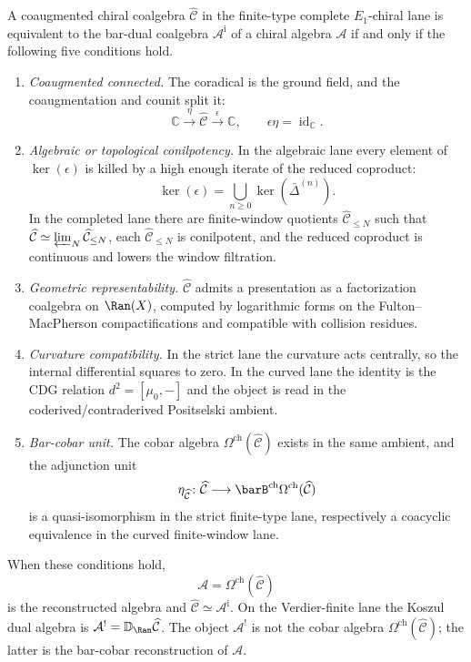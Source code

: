 \begin{theorem}\label{thm:essential-image-koszul}
A coaugmented chiral coalgebra $\widehat{\mathcal{C}}$ in the
finite-type complete $E_1$-chiral lane is equivalent to the bar-dual
coalgebra $\mathcal{A}^{\mathrm i}$ of a chiral algebra
$\mathcal{A}$ if and only if the following five conditions hold.

\begin{enumerate}
\item \emph{Coaugmented connected.} The coradical is the ground field,
and the coaugmentation and counit split it:
 \[\mathbb{C}\xrightarrow{\eta}\widehat{\mathcal{C}}
 \xrightarrow{\epsilon}\mathbb{C},
 \qquad \epsilon\eta=\operatorname{id}_{\mathbb{C}}.\]

\item \emph{Algebraic or topological conilpotency.} In the algebraic
lane every element of $\ker(\epsilon)$ is killed by a high enough
iterate of the reduced coproduct:
\[
\ker(\epsilon)=\bigcup_{n\geq 0}\ker(\bar{\Delta}^{(n)}).
\]
In the completed lane there are finite-window quotients
$\widehat{\mathcal{C}}_{\leq N}$ such that
$\widehat{\mathcal{C}}\simeq\varprojlim_N
\widehat{\mathcal{C}}_{\leq N}$, each
$\widehat{\mathcal{C}}_{\leq N}$ is conilpotent, and the reduced
coproduct is continuous and lowers the window filtration.

\item \emph{Geometric representability.} $\widehat{\mathcal{C}}$
admits a presentation as a factorization coalgebra on $\Ran(X)$,
computed by logarithmic forms on the Fulton--MacPherson
compactifications and compatible with collision residues.

\item \emph{Curvature compatibility.} In the strict lane the curvature
acts centrally, so the internal differential squares to zero. In the
curved lane the identity is the CDG relation $d^2=[\mu_0,-]$ and the
object is read in the coderived/contraderived Positselski ambient.

\item \emph{Bar-cobar unit.} The cobar algebra
$\Omega^{\mathrm{ch}}(\widehat{\mathcal{C}})$ exists in the same
ambient, and the adjunction unit
\[
\eta_{\widehat{\mathcal{C}}}\colon
\widehat{\mathcal{C}}\longrightarrow
\barB^{\mathrm{ch}}\Omega^{\mathrm{ch}}(\widehat{\mathcal{C}})
\]
is a quasi-isomorphism in the strict finite-type lane, respectively a
coacyclic equivalence in the curved finite-window lane.
\end{enumerate}

When these conditions hold,
\[
\mathcal{A}=\Omega^{\mathrm{ch}}(\widehat{\mathcal{C}})
\]
is the reconstructed algebra and
$\widehat{\mathcal{C}}\simeq\mathcal{A}^{\mathrm i}$. On the
Verdier-finite lane the Koszul dual algebra is
$\mathcal{A}^{!}=\mathbb{D}_{\Ran}\widehat{\mathcal{C}}$. The object
$\mathcal{A}^{!}$ is not the cobar algebra
$\Omega^{\mathrm{ch}}(\widehat{\mathcal{C}})$; the latter is the
bar-cobar reconstruction of $\mathcal{A}$.
\end{theorem}

